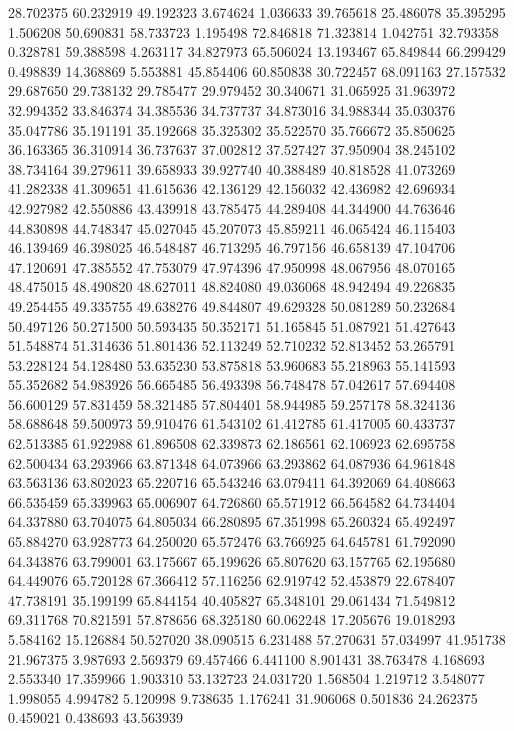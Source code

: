 28.702375
60.232919
49.192323
3.674624
1.036633
39.765618
25.486078
35.395295
1.506208
50.690831
58.733723
1.195498
72.846818
71.323814
1.042751
32.793358
0.328781
59.388598
4.263117
34.827973
65.506024
13.193467
65.849844
66.299429
0.498839
14.368869
5.553881
45.854406
60.850838
30.722457
68.091163
27.157532
29.687650
29.738132
29.785477
29.979452
30.340671
31.065925
31.963972
32.994352
33.846374
34.385536
34.737737
34.873016
34.988344
35.030376
35.047786
35.191191
35.192668
35.325302
35.522570
35.766672
35.850625
36.163365
36.310914
36.737637
37.002812
37.527427
37.950904
38.245102
38.734164
39.279611
39.658933
39.927740
40.388489
40.818528
41.073269
41.282338
41.309651
41.615636
42.136129
42.156032
42.436982
42.696934
42.927982
42.550886
43.439918
43.785475
44.289408
44.344900
44.763646
44.830898
44.748347
45.027045
45.207073
45.859211
46.065424
46.115403
46.139469
46.398025
46.548487
46.713295
46.797156
46.658139
47.104706
47.120691
47.385552
47.753079
47.974396
47.950998
48.067956
48.070165
48.475015
48.490820
48.627011
48.824080
49.036068
48.942494
49.226835
49.254455
49.335755
49.638276
49.844807
49.629328
50.081289
50.232684
50.497126
50.271500
50.593435
50.352171
51.165845
51.087921
51.427643
51.548874
51.314636
51.801436
52.113249
52.710232
52.813452
53.265791
53.228124
54.128480
53.635230
53.875818
53.960683
55.218963
55.141593
55.352682
54.983926
56.665485
56.493398
56.748478
57.042617
57.694408
56.600129
57.831459
58.321485
57.804401
58.944985
59.257178
58.324136
58.688648
59.500973
59.910476
61.543102
61.412785
61.417005
60.433737
62.513385
61.922988
61.896508
62.339873
62.186561
62.106923
62.695758
62.500434
63.293966
63.871348
64.073966
63.293862
64.087936
64.961848
63.563136
63.802023
65.220716
65.543246
63.079411
64.392069
64.408663
66.535459
65.339963
65.006907
64.726860
65.571912
66.564582
64.734404
64.337880
63.704075
64.805034
66.280895
67.351998
65.260324
65.492497
65.884270
63.928773
64.250020
65.572476
63.766925
64.645781
61.792090
64.343876
63.799001
63.175667
65.199626
65.807620
63.157765
62.195680
64.449076
65.720128
67.366412
57.116256
62.919742
52.453879
22.678407
47.738191
35.199199
65.844154
40.405827
65.348101
29.061434
71.549812
69.311768
70.821591
57.878656
68.325180
60.062248
17.205676
19.018293
5.584162
15.126884
50.527020
38.090515
6.231488
57.270631
57.034997
41.951738
21.967375
3.987693
2.569379
69.457466
6.441100
8.901431
38.763478
4.168693
2.553340
17.359966
1.903310
53.132723
24.031720
1.568504
1.219712
3.548077
1.998055
4.994782
5.120998
9.738635
1.176241
31.906068
0.501836
24.262375
0.459021
0.438693
43.563939
